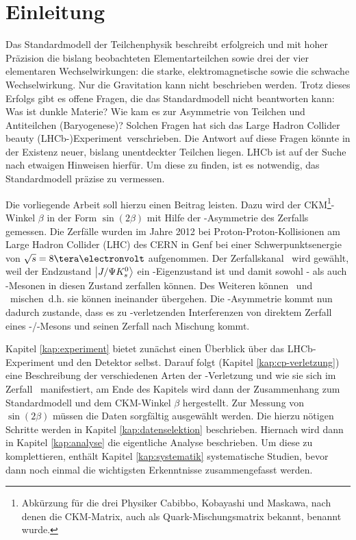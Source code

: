 \chapter{Einleitung}
Das Standardmodell der Teilchenphysik beschreibt erfolgreich und mit hoher Präzision die bislang beobachteten Elementarteilchen sowie drei der vier elementaren Wechselwirkungen: die starke, elektromagnetische sowie die schwache Wechselwirkung. Nur die Gravitation kann nicht beschrieben werden. Trotz dieses Erfolgs gibt es offene Fragen, die das Standardmodell nicht beantworten kann: Was ist dunkle Materie? Wie kam es zur Asymmetrie von Teilchen und Antiteilchen (Baryogenese)? Solchen Fragen hat sich das \glqq Large Hadron Collider beauty (LHCb-)Experiment\grqq\ verschrieben. Die Antwort auf diese Fragen könnte in der Existenz neuer, bislang unentdeckter Teilchen liegen. LHCb ist auf der Suche nach etwaigen Hinweisen hierfür.  Um diese zu finden, ist es notwendig, das Standardmodell präzise zu vermessen. \cite{cern-courier, roadmap}

Die vorliegende Arbeit soll hierzu einen Beitrag leisten. Dazu wird der CKM\footnote{Abkürzung für die drei Physiker Cabibbo, Kobayashi und Maskawa, nach denen die CKM-Matrix, auch als Quark-Mischungsmatrix bekannt, benannt wurde.}-Winkel $\beta$ in der Form $\sin(2\beta)$ mit Hilfe der \CP-Asymmetrie des Zerfalls \Decaychannel gemessen. Die Zerfälle wurden im Jahre 2012 bei Proton-Proton-Kollisionen am Large Hadron Collider (LHC) des CERN in Genf bei einer Schwerpunktsenergie von $\sqrt{s}=8\tera\electronvolt$ aufgenommen. Der Zerfallskanal \Decaychannel\ wird gewählt, weil der Endzustand $\Ket{J/\Psi K_s^0}$ ein \CP-Eigenzustand ist und damit sowohl \Bd- als auch \Bdbar-Mesonen in diesen Zustand zerfallen können. Des Weiteren können \Bd\ und \Bdbar\ \glqq mischen\grqq\, d.h. sie können ineinander übergehen. Die \CP-Asymmetrie kommt nun dadurch zustande, dass es zu \CP-verletzenden Interferenzen von direktem Zerfall eines \Bd-/\Bdbar-Mesons und seinen Zerfall nach Mischung kommt.

Kapitel \ref{kap:experiment} bietet zunächst einen Überblick über das LHCb-Experiment und den Detektor selbst. Darauf folgt (Kapitel \ref{kap:cp-verletzung}) eine Beschreibung der verschiedenen Arten der \CP-Verletzung und wie sie sich im Zerfall \Decaychannel\ manifestiert, am Ende des Kapitels wird dann der Zusammenhang zum Standardmodell und dem CKM-Winkel $\beta$ hergestellt. Zur Messung von $\sin(2\beta)$ müssen die Daten sorgfältig ausgewählt werden. Die hierzu nötigen Schritte werden in Kapitel \ref{kap:datenselektion} beschrieben. Hiernach wird dann in Kapitel \ref{kap:analyse} die eigentliche Analyse beschrieben. Um diese zu komplettieren, enthält Kapitel \ref{kap:systematik} systematische Studien, bevor dann noch einmal die wichtigsten Erkenntnisse zusammengefasst werden.